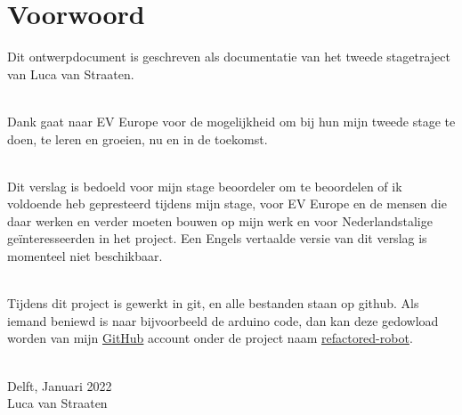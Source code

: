 \chapter*{Voorwoord}

Dit ontwerpdocument is geschreven als documentatie van het tweede stagetraject
van Luca van Straaten.\\\

Dank gaat naar EV Europe voor de mogelijkheid om bij hun mijn tweede stage te
doen, te leren en groeien, nu en in de toekomst.\\\

Dit verslag is bedoeld voor mijn stage beoordeler om te beoordelen of ik
voldoende heb gepresteerd tijdens mijn stage, voor EV Europe en de mensen die
daar werken en verder moeten bouwen op mijn werk en voor Nederlandstalige
geïnteresseerden in het project. Een Engels vertaalde versie van dit verslag
is momenteel niet beschikbaar.\\\

Tijdens dit project is gewerkt in git, en alle bestanden staan op github. Als
iemand beniewd is naar bijvoorbeeld de arduino code, dan kan deze gedowload
worden van mijn \href{https://github.com/lucanatorvs}{GitHub} account onder de
project naam
\href{https://github.com/lucanatorvs/refactored-robot}{refactored-robot}.\\\

Delft, Januari 2022\\Luca van Straaten
